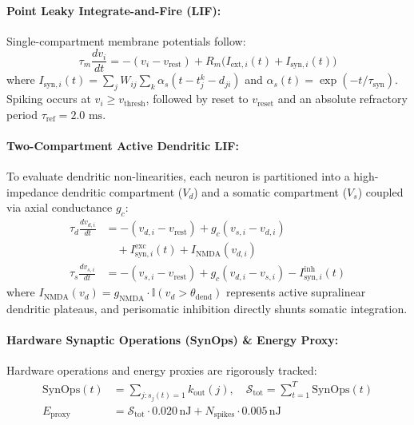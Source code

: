 \documentclass[10pt,twocolumn,letterpaper]{article}
\begin{document}
\paragraph{Point Leaky Integrate-and-Fire (LIF):}
Single-compartment membrane potentials follow:
\begin{equation}
\tau_m \frac{dv_i}{dt} = -(v_i - v_{\mathrm{rest}}) + R_m \big( I_{\mathrm{ext}, i}(t) + I_{\mathrm{syn}, i}(t) \big)
\end{equation}
where $I_{\mathrm{syn}, i}(t) = \sum_j W_{ij} \sum_k \alpha_s(t - t_j^k - d_{ji})$ and $\alpha_s(t) = \exp(-t/\tau_{\mathrm{syn}})$. Spiking occurs at $v_i \ge v_{\mathrm{thresh}}$, followed by reset to $v_{\mathrm{reset}}$ and an absolute refractory period $\tau_{\mathrm{ref}} = 2.0\text{ ms}$.

\paragraph{Two-Compartment Active Dendritic LIF:}
To evaluate dendritic non-linearities, each neuron is partitioned into a high-impedance dendritic compartment ($V_d$) and a somatic compartment ($V_s$) coupled via axial conductance $g_c$:
\begin{align}
\tau_d \frac{dv_{d, i}}{dt} &= -(v_{d, i} - v_{\mathrm{rest}}) + g_c (v_{s, i} - v_{d, i}) \nonumber \\
&\quad + I_{\mathrm{syn}, i}^{\mathrm{exc}}(t) + I_{\mathrm{NMDA}}(v_{d, i}) \\
\tau_s \frac{dv_{s, i}}{dt} &= -(v_{s, i} - v_{\mathrm{rest}}) + g_c (v_{d, i} - v_{s, i}) - I_{\mathrm{syn}, i}^{\mathrm{inh}}(t)
\end{align}
where $I_{\mathrm{NMDA}}(v_d) = g_{\mathrm{NMDA}} \cdot \mathbb{I}(v_d > \theta_{\mathrm{dend}})$ represents active supralinear dendritic plateaus, and perisomatic inhibition directly shunts somatic integration.

\paragraph{Hardware Synaptic Operations (SynOps) \& Energy Proxy:}
Hardware operations and energy proxies are rigorously tracked:
\begin{align}
\mathrm{SynOps}(t) &= \sum_{j: s_j(t)=1} k_{\mathrm{out}}(j), \quad \mathcal{S}_{\mathrm{tot}} = \sum_{t=1}^T \mathrm{SynOps}(t) \\
E_{\mathrm{proxy}} &= \mathcal{S}_{\mathrm{tot}} \cdot 0.020\,\mathrm{nJ} + N_{\mathrm{spikes}} \cdot 0.005\,\mathrm{nJ}
\end{align}
\end{document}
